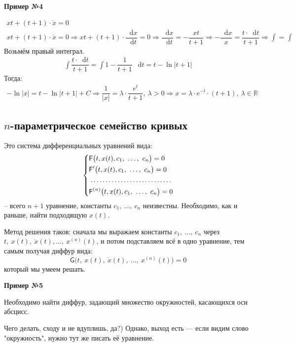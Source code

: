\documentclass[a4paper,12pt]{article}
\newcommand{\R}{\mathbb{R}}
\renewcommand{\G}{\mathsf{G}}
\renewcommand*\d{\mathop{}\!\mathrm{d}}
\newcommand{\dx}{\dot{x}}
\newcommand{\F}{\mathsf{F}}
\newcommand{\ds}{\displaystyle}
\begin{document}
\textbf{Пример №4}

\begin{gather*}
	xt + (t + 1) \cdot \dx = 0\\
	xt + (t + 1) \cdot \dx = 0 \Longrightarrow xt + (t + 1) \cdot \dfrac{\d x}{\d t} = 0 \Longrightarrow \dfrac{\d x}{\d t}  = -\dfrac{xt}{t + 1} \Longrightarrow -\dfrac{\d x}{x} = \dfrac{t \cdot \d t}{t + 1} \Longrightarrow \ds\int = \int
\end{gather*}
Возьмём правый интеграл.
\begin{gather*}
	\ds\int \dfrac{t\cdot \d t}{t + 1} = \ds\int 1 - \dfrac{1}{t + 1}\ \d t = t - \ln |t + 1|
\end{gather*}
Тогда:
\begin{gather*}
	 -\ln|x| = t - \ln |t + 1| + C \Longrightarrow \dfrac{1}{|x|} = \lambda \cdot \dfrac{e^{t}}{t + 1},\ \lambda > 0 \Longrightarrow x = \lambda \cdot e^{-t} \cdot (t + 1),\ \lambda \in \R
\end{gather*}

\subsection{$n$-параметрическое семейство кривых}

Это система дифференциальных уравнений вида:
\[\left\{\begin{gathered}
	\F\big(t, x(t), c_1,\ \ldots,\ c_n\big) = 0\hfill\\
	\F'\big(t, x(t), c_1,\ \ldots,\ c_n\big) = 0\hfill\\
	\dotfill\\
	\F^{(n)}\big(t, x(t), c_1,\ \ldots,\ c_n\big) = 0\hfill
\end{gathered}\right.\] -- всего $n + 1$ уравнение, константы $c_1,\ \ldots,\ c_n$ неизвестны. Необходимо, как и раньше, найти подходящую $x(t)$.

Метод решения таков: сначала мы выражаем константы $c_1,\ \ldots,\ c_n$ через $t,\ x(t),\ \dx(t), \ldots,\ x^{(n)}(t)$, и потом подставляем всё в одно уравнение, тем самым получая диффур вида:
\[\G\big(t,\ x(t),\ \dx(t),\ \ldots,\ x^{(n)}(t)\big) = 0\] который мы умеем решать.

\textbf{Пример №5}

Необходимо найти диффур, задающий множество окружностей, касающихся оси абсцисс.

Чего делать, сходу и не вдуплишь, да?) Однако, выход есть --- если видим слово "окружность", нужно тут же писать её уравнение. 
\end{document}
